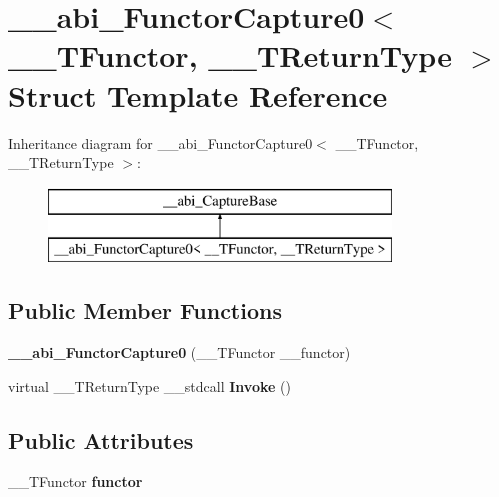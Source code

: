 \hypertarget{struct____abi___functor_capture0}{}\section{\+\_\+\+\_\+abi\+\_\+\+Functor\+Capture0$<$ \+\_\+\+\_\+\+T\+Functor, \+\_\+\+\_\+\+T\+Return\+Type $>$ Struct Template Reference}
\label{struct____abi___functor_capture0}
Inheritance diagram for \+\_\+\+\_\+abi\+\_\+\+Functor\+Capture0$<$ \+\_\+\+\_\+\+T\+Functor, \+\_\+\+\_\+\+T\+Return\+Type $>$\+:\begin{figure}[H]
\begin{center}
\leavevmode
\includegraphics[height=2.000000cm]{de/d45/struct____abi___functor_capture0}
\end{center}
\end{figure}
\subsection*{Public Member Functions}
\begin{DoxyCompactItemize}
\item 
\mbox{\label{struct____abi___functor_capture0_a2b6740aab1d1056ee2bd53a030fec05f}} 
{\bfseries \+\_\+\+\_\+abi\+\_\+\+Functor\+Capture0} (\+\_\+\+\_\+\+T\+Functor \+\_\+\+\_\+functor)
\item 
\mbox{\label{struct____abi___functor_capture0_a47bc3e551f56e9eb5f0021bf96206ab8}} 
virtual \+\_\+\+\_\+\+T\+Return\+Type \+\_\+\+\_\+stdcall {\bfseries Invoke} ()
\end{DoxyCompactItemize}
\subsection*{Public Attributes}
\begin{DoxyCompactItemize}
\item 
\mbox{\label{struct____abi___functor_capture0_a8cd4f380aede129f260faee1d9ff410b}} 
\+\_\+\+\_\+\+T\+Functor {\bfseries functor}
\end{DoxyCompactItemize}
